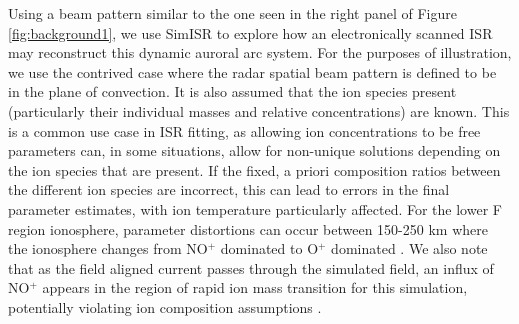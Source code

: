 \documentclass[draft,ras]{agutex}
\begin{document}
\begin{article}
Using a beam pattern similar to the one seen in the right panel of Figure \ref{fig:background1}, we use SimISR to explore how an electronically scanned ISR may reconstruct this dynamic auroral arc system.  For the purposes of illustration, we use the contrived case where the radar spatial beam pattern is defined to be in the plane of convection.  It is also assumed that the ion species present (particularly their individual masses and relative concentrations) are known. This is a common use case in ISR fitting, as allowing ion concentrations to be free parameters can, in some situations, allow for non-unique solutions depending on the ion species that are present.  If the fixed, a priori composition ratios between the different ion species are incorrect, this can lead to errors in the final parameter estimates, with ion temperature particularly affected. For the lower F region ionosphere, parameter distortions can occur between 150-250 km where the ionosphere changes from NO$^+$ dominated to O$^+$ dominated \citep{Zettergren:2011ej, Blelly:2010gf}. We also note that as the field aligned current passes through the simulated field, an influx of NO$^+$ appears in the region of rapid ion mass transition for this simulation, potentially violating ion composition assumptions \citep{Perry:2015jf}.


\end{article}
\end{document}
